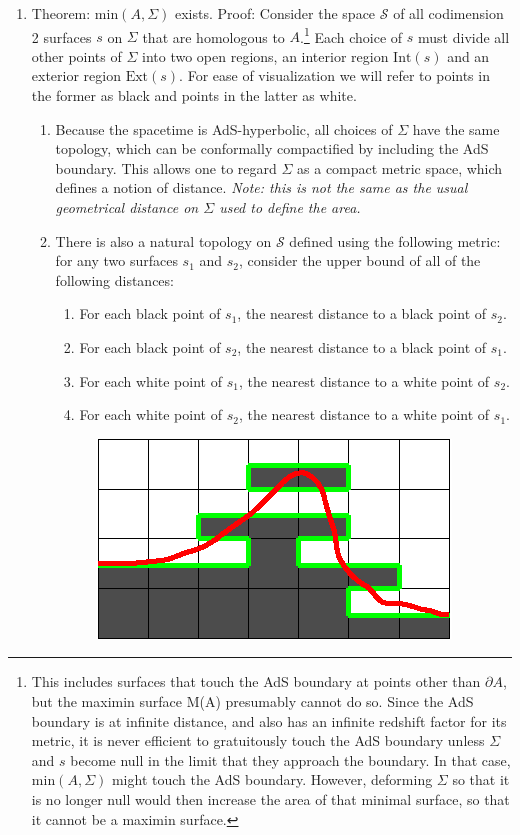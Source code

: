 \documentclass[12pt]{article}
\begin{document}
\begin{enumerate}[resume]
\item \label{mexists} Theorem: $\mathrm{min}(A,\Sigma)$ exists.  Proof: Consider the space $\mathcal{S}$ of all codimension 2 surfaces $s$ on $\Sigma$ that are homologous to $A$.\footnote{This includes surfaces that touch the AdS boundary at points other than $\partial A$, but the maximin surface M(A) presumably cannot do so.  Since the AdS boundary is at infinite distance, and also has an infinite redshift factor for its metric, it is never efficient to gratuitously touch the AdS boundary unless $\Sigma$ and $s$ become null in the limit that they approach the boundary.  In that case, $\mathrm{min}(A,\Sigma)$ might touch the AdS boundary.  However, deforming $\Sigma$ so that it is no longer null would then increase the area of that minimal surface, so that it cannot be a maximin surface.} Each choice of $s$ must divide all other points of $\Sigma$ into two open regions, an interior region $\mathrm{Int}(s)$ and an exterior region $\mathrm{Ext}(s)$.  For ease of visualization we will refer to points in the former as black and points in the latter as white.
	\begin{enumerate}
	\item Because the spacetime is AdS-hyperbolic, all choices of $\Sigma$ have the same topology, which can be conformally compactified by including the AdS boundary.  This allows one to regard $\Sigma$ as a compact metric space, which defines a notion of distance.  \emph{Note: this is not the same as the usual geometrical distance on $\Sigma$ used to define the area.}
	\item \label{mintop} There is also a natural topology on $\mathcal{S}$ defined using the following metric: for any two surfaces $s_1$ and $s_2$, consider the upper bound of all of the following distances:
		\begin{enumerate}
		\item For each black point of $s_1$, the nearest distance to a black point of $s_2$.
		\item For each black point of $s_2$, the nearest distance to a black point of $s_1$.
		\item For each white point of $s_1$, the nearest distance to a white point of $s_2$.
		\item For each white point of $s_2$, the nearest distance to a white point of $s_1$.
		\end{enumerate}
\begin{figure}[hbt]
\centering
\includegraphics[width=.35\textwidth]{approx.eps}

\end{figure}
\end{enumerate}
\end{enumerate}
\end{document}
